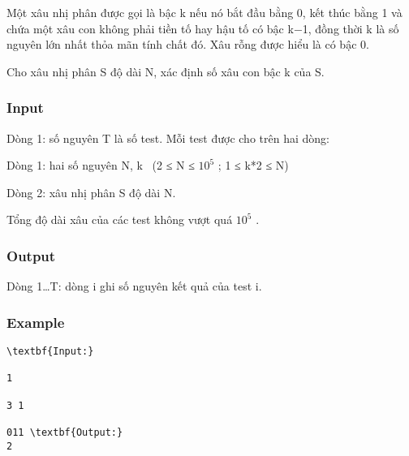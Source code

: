 



   Một xâu nhị phân được gọi là bậc k nếu nó bắt đầu bằng 0, kết thúc bằng 1 và chứa một xâu con không phải tiền tố hay hậu tố có bậc k−1, đồng thời k là số nguyên lớn nhất thỏa mãn tính chất đó. Xâu rỗng được hiểu là có bậc 0.  

   Cho xâu nhị phân S độ dài N, xác định số xâu con bậc k của S.  

\subsubsection{   Input  }

   Dòng 1: số nguyên T là số test. Mỗi test được cho trên hai dòng:  

   Dòng 1: hai số nguyên N, k  (2 ≤ N ≤ $10^{5}$   ; 1 ≤ k*2 ≤ N)  

   Dòng 2: xâu nhị phân S độ dài N.  

   Tổng độ dài xâu của các test không vượt quá $10^{5}$   .  

\subsubsection{   Output  }

   Dòng 1…T: dòng i ghi số nguyên kết quả của test i.  

\subsubsection{   Example  }
\begin{verbatim}
\textbf{Input:}

1

3 1

011 \textbf{Output:}
2\end{verbatim}
